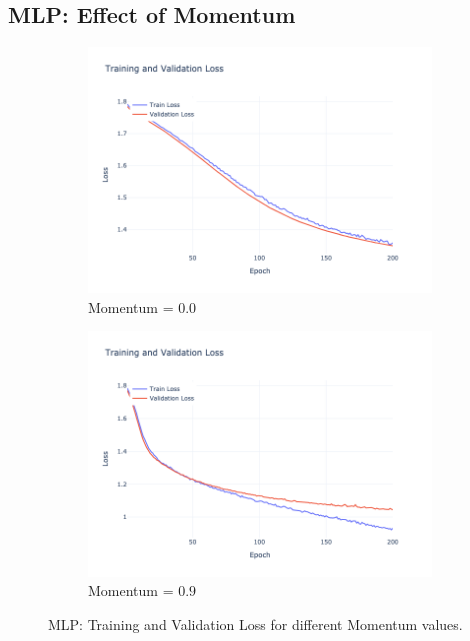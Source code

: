 \subsection{MLP: Effect of Momentum}
\begin{figure}[htbp!]
    \centering
    \begin{subfigure}{0.45\textwidth}
        \centering
        \includegraphics[width=\textwidth]{images/mlp-training-validation-loss-batch-1024-lr-0.002-epochs-200-hidden-200-dropout-0.3-l2-0.0-layers-2-act-relu-opt-sgd-mom-0.0.png}
        \caption{Momentum = $0.0$}
    \end{subfigure}
    \begin{subfigure}{0.45\textwidth}
        \centering
        \includegraphics[width=\textwidth]{images/mlp-training-validation-loss-batch-1024-lr-0.002-epochs-200-hidden-200-dropout-0.3-l2-0.0-layers-2-act-relu-opt-sgd-mom-0.9.png}
        \caption{Momentum = $0.9$}
    \end{subfigure}
    \caption{MLP: Training and Validation Loss for different Momentum values.}
    \label{fig:mlp_momentum_loss}
\end{figure}

